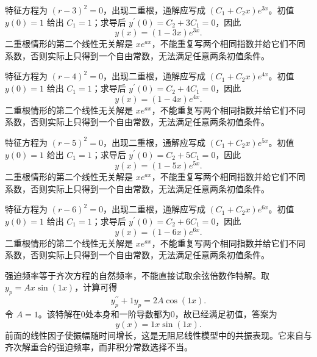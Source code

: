 \documentclass[UTF8,12pt,a4paper,fontset=fandol]{ctexart}
\begin{document}
\begin{solve}\label{ans:c23q15}
特征方程为 $(r-3)^2=0$，出现二重根，通解应写成 $(C_1+C_2x)e^{3x}$。初值 $y(0)=1$ 给出 $C_1=1$；求导后 $y^{\prime}(0)=C_2+3C_1=0$，因此
\[
y(x)=(1-3x)e^{3x}.
\]
二重根情形的第二个线性无关解是 $xe^{ax}$，不能重复写两个相同指数并给它们不同系数，否则实际上只得到一个自由常数，无法满足任意两条初值条件。
\end{solve}

\begin{solve}\label{ans:c23q16}
特征方程为 $(r-4)^2=0$，出现二重根，通解应写成 $(C_1+C_2x)e^{4x}$。初值 $y(0)=1$ 给出 $C_1=1$；求导后 $y^{\prime}(0)=C_2+4C_1=0$，因此
\[
y(x)=(1-4x)e^{4x}.
\]
二重根情形的第二个线性无关解是 $xe^{ax}$，不能重复写两个相同指数并给它们不同系数，否则实际上只得到一个自由常数，无法满足任意两条初值条件。
\end{solve}

\begin{solve}\label{ans:c23q17}
特征方程为 $(r-5)^2=0$，出现二重根，通解应写成 $(C_1+C_2x)e^{5x}$。初值 $y(0)=1$ 给出 $C_1=1$；求导后 $y^{\prime}(0)=C_2+5C_1=0$，因此
\[
y(x)=(1-5x)e^{5x}.
\]
二重根情形的第二个线性无关解是 $xe^{ax}$，不能重复写两个相同指数并给它们不同系数，否则实际上只得到一个自由常数，无法满足任意两条初值条件。
\end{solve}

\begin{solve}\label{ans:c23q18}
特征方程为 $(r-6)^2=0$，出现二重根，通解应写成 $(C_1+C_2x)e^{6x}$。初值 $y(0)=1$ 给出 $C_1=1$；求导后 $y^{\prime}(0)=C_2+6C_1=0$，因此
\[
y(x)=(1-6x)e^{6x}.
\]
二重根情形的第二个线性无关解是 $xe^{ax}$，不能重复写两个相同指数并给它们不同系数，否则实际上只得到一个自由常数，无法满足任意两条初值条件。
\end{solve}

\begin{solve}\label{ans:c23q19}
强迫频率等于齐次方程的自然频率，不能直接试取余弦倍数作特解。取 $y_p=A x\sin(1x)$，计算可得
\[
y_p^{\prime\prime}+1y_p=2A\cos(1x).
\]
令 $A=1$。该特解在0处本身和一阶导数都为0，故已经满足初值，答案为
\[
y(x)=1x\sin(1x).
\]
前面的线性因子使振幅随时间增长，这是无阻尼线性模型中的共振表现。它来自与齐次解重合的强迫频率，而非积分常数选择不当。
\end{solve}
\end{document}

